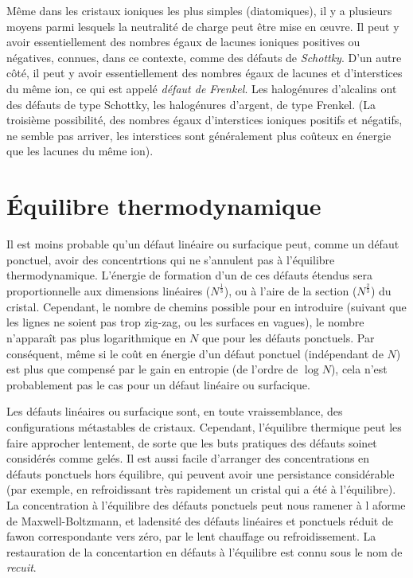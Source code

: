 Même dans les cristaux ioniques les plus simples (diatomiques), il y a plusieurs moyens parmi lesquels la neutralité de charge peut être mise en œuvre. Il peut y avoir essentiellement des nombres égaux de lacunes ioniques positives ou négatives, connues, dans ce contexte, comme des défauts de \emph{Schottky}. D'un autre côté, il peut y avoir essentiellement des nombres égaux de lacunes et d'interstices du même ion, ce qui est appelé \emph{défaut de Frenkel}. Les halogénures d'alcalins ont des défauts de type Schottky, les halogénures d'argent, de type Frenkel. (La troisième possibilité, des nombres égaux d'interstices ioniques positifs et négatifs, ne semble pas arriver, les interstices sont généralement plus coûteux en énergie que les lacunes du même ion).


\section{Équilibre thermodynamique}

Il est moins probable qu'un défaut linéaire ou surfacique peut, comme un défaut ponctuel, avoir des concentrtions qui ne s'annulent pas à l'équilibre thermodynamique. L'énergie de formation d'un de ces défauts étendus sera proportionnelle aux dimensions linéaires ($N^\frac{1}{3}$), ou à l'aire de la section ($N^\frac{2}{3}$) du cristal. Cependant, le nombre de chemins possible pour en introduire (suivant que les lignes ne soient pas trop zig-zag, ou les surfaces en vagues), le nombre n'apparaît pas plus logarithmique en $N$ que pour les défauts ponctuels. Par conséquent, même si le coût en énergie d'un défaut ponctuel (indépendant de $N$) est plus que compensé par le gain en entropie (de l'ordre de $\log N$), cela n'est probablement pas le cas pour un défaut linéaire ou surfacique.

Les défauts linéaires ou surfacique sont, en toute vraissemblance, des configurations métastables de cristaux. Cependant, l'équilibre thermique peut les faire approcher lentement, de sorte que les buts pratiques des défauts soinet considérés comme gelés. Il est aussi facile d'arranger des concentrations en défauts ponctuels hors équilibre, qui peuvent avoir une persistance considérable (par exemple, en refroidissant très rapidement un cristal qui a été à l'équilibre). La concentration à l'équilibre des défauts ponctuels peut nous ramener à l aforme de Maxwell-Boltzmann, et ladensité des défauts linéaires et ponctuels réduit de fawon correspondante vers zéro, par le lent chauffage ou refroidissement. La restauration de la concentartion en défauts à l'équilibre est connu sous le nom de \emph{recuit}.

